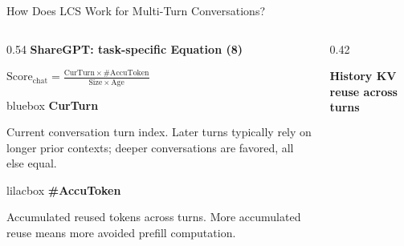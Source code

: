 \documentclass[aspectratio=169,10pt]{beamer}
\begin{document}
\begin{frame}[t,label=M10]{How Does LCS Work for Multi-Turn Conversations?}
\vspace{0.14cm}
\begin{columns}[T,onlytextwidth]
\begin{column}{0.54\textwidth}
{\small\bfseries\color{Accent}ShareGPT: task-specific Equation (8)}\par
\vspace{0.12cm}
{\large $\displaystyle \mathrm{Score}_{\mathrm{chat}}=\frac{\mathrm{CurTurn}\times\#\mathrm{AccuToken}}{\mathrm{Size}\times\mathrm{Age}}$\par}
\vspace{0.10cm}
\begin{beamercolorbox}[wd=\linewidth,rounded=true,sep=0.10cm]{bluebox}
{\small\bfseries\color{Accent}CurTurn}\par\vspace{0.08cm}
{\footnotesize Current conversation turn index. Later turns typically rely on longer prior contexts; deeper conversations are favored, all else equal.\par}
\end{beamercolorbox}
\vspace{0.08cm}
\begin{beamercolorbox}[wd=\linewidth,rounded=true,sep=0.10cm]{lilacbox}
{\small\bfseries\color{Accent}\#AccuToken}\par\vspace{0.08cm}
{\footnotesize Accumulated reused tokens across turns. More accumulated reuse means more avoided prefill computation.\par}
\end{beamercolorbox}
\end{column}
\begin{column}{0.42\textwidth}
{\centering\small\bfseries\color{Accent}History KV reuse across turns\par}
\vspace{0.24cm}
\centering
{}
\end{column}
\end{columns}
\end{frame}
\end{document}
